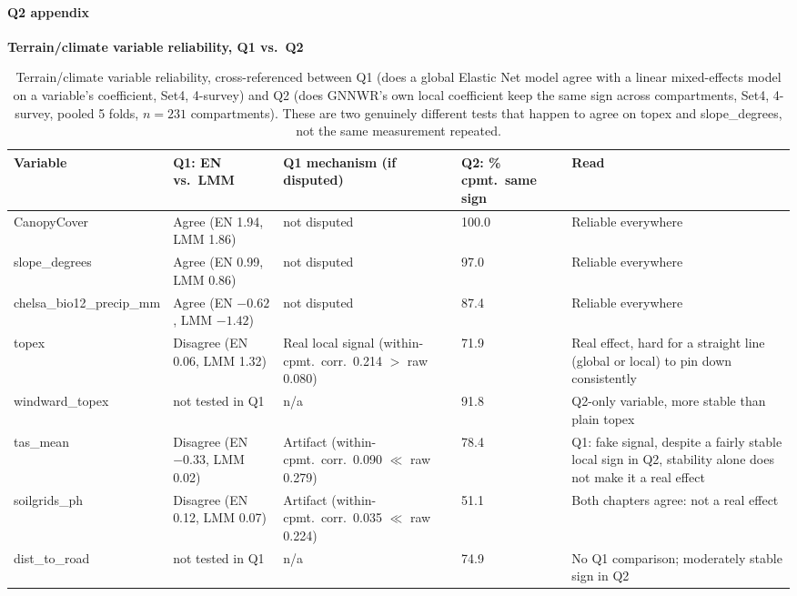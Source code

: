 \paragraph*{Q2 appendix}
\label{app:results-q2}


\begin{table}[H]
\centering
\textbf{Terrain/climate variable reliability, Q1 vs.\ Q2}\label{app:results-q2-reliability}\\[4pt]
\scriptsize
\setlength{\tabcolsep}{3pt}
\renewcommand{\arraystretch}{1.2}
\begin{tabular}{p{2.4cm}p{2.6cm}p{3.6cm}p{1.3cm}p{2.6cm}}
\toprule
Variable & Q1: EN vs.\ LMM & Q1 mechanism (if disputed) & Q2: \% cpmt.\ same sign & Read \\
\midrule
CanopyCover & Agree (EN 1.94, LMM 1.86) & not disputed & 100.0 & Reliable everywhere \\
slope\_degrees & Agree (EN 0.99, LMM 0.86) & not disputed & 97.0 & Reliable everywhere \\
chelsa\_bio12\_precip\_mm & Agree (EN $-0.62$, LMM $-1.42$) & not disputed & 87.4 & Reliable everywhere \\
topex & Disagree (EN 0.06, LMM 1.32) & Real local signal (within-cpmt.\ corr.\ 0.214 $>$ raw 0.080) & 71.9 & Real effect, hard for a straight line (global or local) to pin down consistently \\
windward\_topex & not tested in Q1 & n/a & 91.8 & Q2-only variable, more stable than plain topex \\
tas\_mean & Disagree (EN $-0.33$, LMM 0.02) & Artifact (within-cpmt.\ corr.\ 0.090 $\ll$ raw 0.279) & 78.4 & Q1: fake signal, despite a fairly stable local sign in Q2, stability alone does not make it a real effect \\
soilgrids\_ph & Disagree (EN 0.12, LMM 0.07) & Artifact (within-cpmt.\ corr.\ 0.035 $\ll$ raw 0.224) & 51.1 & Both chapters agree: not a real effect \\
dist\_to\_road & not tested in Q1 & n/a & 74.9 & No Q1 comparison; moderately stable sign in Q2 \\
\bottomrule
\end{tabular}
\caption{\small{Terrain/climate variable reliability, cross-referenced between Q1 (does a
global Elastic Net model agree with a linear mixed-effects model on a variable's
coefficient, Set4, 4-survey) and Q2 (does GNNWR's own local coefficient keep the same sign
across compartments, Set4, 4-survey, pooled 5 folds, $n=231$ compartments). These are two
genuinely different tests that happen to agree on topex and slope\_degrees, not the same
measurement repeated.}}
\label{tab:results-q2-reliability}
\end{table}

